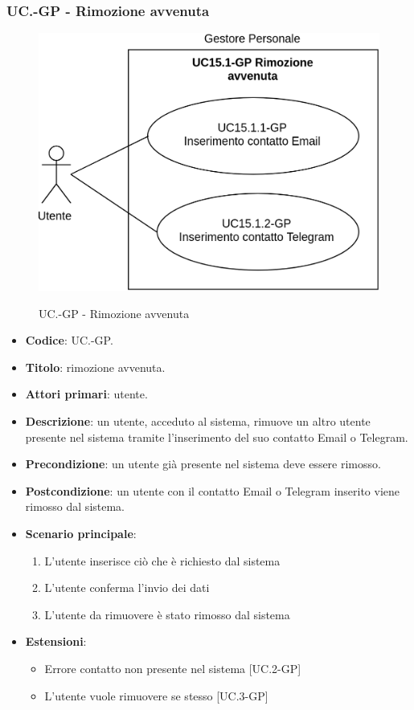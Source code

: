 	\subsubsection{UC\theuccount.\thesubuccount-GP - Rimozione avvenuta}
		\begin{figure}[H]
			\centering
			\includegraphics[width=0.6\columnwidth]{img/casi_d'uso/UC15_1.png}\\
			\caption{UC\theuccount.\thesubuccount-GP - Rimozione avvenuta}
		\end{figure}
		\begin{itemize}
			\item \textbf{Codice}: UC\theuccount.\thesubuccount-GP.
			\item \textbf{Titolo}: rimozione avvenuta.
			\item \textbf{Attori primari}: utente.
			\item \textbf{Descrizione}: un utente, acceduto al sistema, rimuove un altro utente presente nel sistema tramite l'inserimento del suo contatto Email o Telegram.
			\item \textbf{Precondizione}: un utente già presente nel sistema deve essere rimosso.
			\item \textbf{Postcondizione}: un utente con il contatto Email o Telegram inserito viene rimosso dal sistema.
			\item \textbf{Scenario principale}:
			\begin{enumerate}
				\item L'utente inserisce ciò che è richiesto dal sistema
				\item L'utente conferma l'invio dei dati
				\item L'utente da rimuovere è stato rimosso dal sistema
			\end{enumerate}
			\item \textbf{Estensioni}:
			\begin{itemize}
				\item Errore contatto non presente nel sistema [UC\theuccount.2-GP]
				\item L'utente vuole rimuovere se stesso [UC\theuccount.3-GP]
			\end{itemize}
		\end{itemize}
			
